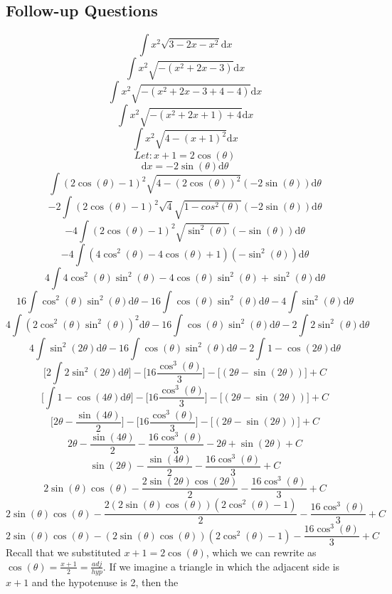 \documentclass[letterpaper, 12pt]{article}
\newcommand*{\diff}{\mathrm{d}}
\begin{document}
\subsection*{Follow-up Questions}
\[ \int{x^{2}\sqrt{3-2x-x^{2}}\diff{x}} \]
\[ \int{x^{2}\sqrt{-(x^{2}+2x-3)}\diff{x}} \]
\[ \int{x^{2}\sqrt{-(x^{2}+2x-3+4-4)}\diff{x}} \]
\[ \int{x^{2}\sqrt{-(x^{2}+2x+1)+4}\diff{x}} \]
\[ \int{x^{2}\sqrt{4-(x+1)^{2}}\diff{x}} \]
\[ Let: x + 1 = 2\cos(\theta) \]
\[ \diff{x} = -2\sin(\theta)\diff{\theta} \]
\[ \int{(2\cos(\theta)-1)^{2}\sqrt{4-(2\cos(\theta))^{2}}
   (-2\sin(\theta))\diff{\theta}} \]
\[ -2\int{(2\cos(\theta)-1)^{2}\sqrt{4}\sqrt{1-cos^{2}(\theta)}
   (-2\sin(\theta))\diff{\theta}} \]
\[ -4\int{(2\cos(\theta)-1)^{2}\sqrt{\sin^{2}(\theta)}
   (-\sin(\theta))\diff{\theta}} \]
\[ -4\int{(4\cos^{2}(\theta)-4\cos(\theta)+1)
   (-\sin^{2}(\theta))\diff{\theta}} \]
\[ 4\int{4\cos^{2}(\theta)\sin^{2}(\theta)-4\cos(\theta)\sin^{2}(\theta)+
   \sin^{2}(\theta)\diff{\theta}} \]
\[ 16\int{\cos^{2}(\theta)\sin^{2}(\theta)\diff{\theta}}-
   16\int{\cos(\theta)\sin^{2}(\theta)\diff{\theta}}-
   4\int{\sin^{2}(\theta)\diff{\theta}} \]
\[ 4\int{(2\cos^{2}(\theta)\sin^{2}(\theta))^{2}\diff{\theta}}-
   16\int{\cos(\theta)\sin^{2}(\theta)\diff{\theta}}-
   2\int{2\sin^{2}(\theta)\diff{\theta}} \]
\[ 4\int{\sin^{2}(2\theta)\diff{\theta}}-
   16\int{\cos(\theta)\sin^{2}(\theta)\diff{\theta}}-
   2\int{1-\cos(2\theta)\diff{\theta}} \]
\[ \bigg[2\int{2\sin^{2}(2\theta)\diff{\theta}}\bigg]-
   \bigg[16\frac{\cos^{3}(\theta)}{3}\bigg]-
   \bigg[(2\theta-\sin(2\theta))\bigg]+C \]
\[ \bigg[\int{1-\cos(4\theta)\diff{\theta}}\bigg]-
   \bigg[16\frac{\cos^{3}(\theta)}{3}\bigg]-
   \bigg[(2\theta-\sin(2\theta))\bigg]+C \]
\[ \bigg[2\theta-\frac{\sin(4\theta)}{2}\bigg]-
   \bigg[16\frac{\cos^{3}(\theta)}{3}\bigg]-
   \bigg[(2\theta-\sin(2\theta))\bigg]+C \]
\[ 2\theta-\frac{\sin(4\theta)}{2}-
   \frac{16\cos^{3}(\theta)}{3}-
   2\theta+\sin(2\theta)+C \]
\[ \sin(2\theta)-\frac{\sin(4\theta)}{2}-\frac{16\cos^{3}(\theta)}{3}+C \]
\[ 2\sin(\theta)\cos(\theta)-
   \frac{2\sin(2\theta)\cos(2\theta)}{2}-
   \frac{16\cos^{3}(\theta)}{3}+C \]
\[ 2\sin(\theta)\cos(\theta)-
   \frac{2(2\sin(\theta)\cos(\theta))(2\cos^{2}(\theta)-1)}{2}-
   \frac{16\cos^{3}(\theta)}{3}+C \]
\[ 2\sin(\theta)\cos(\theta)-
   (2\sin(\theta)\cos(\theta))(2\cos^{2}(\theta)-1)-
   \frac{16\cos^{3}(\theta)}{3}+C \]
Recall that we substituted \( x+1 = 2\cos(\theta) \), which we can rewrite as
\(\cos(\theta) = \frac{x+1}{2} = \frac{adj}{hyp} \). If we imagine a triangle
in which the adjacent side is \( x+1 \) and the hypotenuse is 2, then the
\end{document}
